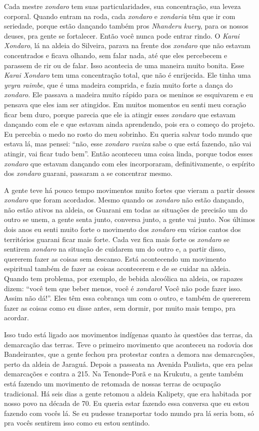 Cada mestre \emph{xondaro} tem suas particularidades, sua concentração, sua
leveza corporal. Quando entram na roda, cada \emph{xondaro} e \emph{xondaria} têm que
ir com seriedade, porque estão dançando também pros \emph{Nhanderu kuery}, para
os nossos deuses, pra gente se fortalecer. Então você nunca pode entrar
rindo. O \emph{Karai Xondaro}, lá na aldeia do Silveira, parava na frente dos
\emph{xondaro} que não estavam concentrados e ficava olhando, sem falar nada,
até que eles percebecem e parassem de rir ou de falar. Isso acontecia
de uma maneira muito bonita. Esse \emph{Karai Xondaro} tem uma concentração
total, que não é enrijecida. Ele tinha uma \emph{yvyra raimbe}, que é uma
madeira comprida, e fazia muito forte a dança do \emph{xondaro}. Ele passava a
madeira muito rápido para os meninos se esquivarem e eu pensava que
eles iam ser atingidos. Em muitos momentos eu senti meu coração ficar
bem duro, porque parecia que ele ia atingir esses \emph{xondaro} que estavam
dançando com ele e que estavam ainda aprendendo, pois era o começo do
projeto. Eu percebia o medo no rosto do meu sobrinho. Eu queria salvar
todo mundo que estava lá, mas pensei: ``não, esse \emph{xondaro ruvixa} sabe o
que está fazendo, não vai atingir, vai ficar tudo bem''. Então aconteceu
uma coisa linda, porque todos esses \emph{xondaro} que estavam dançando com
eles incorporaram, definitivamente, o espírito dos \emph{xondaro} guarani,
passaram a se concentrar mesmo.

A gente teve há pouco tempo movimentos muito fortes que vieram a partir
desses \emph{xondaro} que foram acordados. Mesmo quando os \emph{xondaro} não estão
dançando, não estão ativos na aldeia, os Guarani em todas as situações
de precisão um do outro se unem, a gente senta junto, conversa junto, a
gente vai junto. Nos últimos dois anos eu senti muito forte o movimento
dos \emph{xondaro} em vários cantos dos territórios guarani ficar mais forte.
Cada vez fica mais forte os \emph{xondaro} se sentirem \emph{xondaro} na situação de
cuidarem um do outro e, a partir disso, quererem fazer as coisas sem
descanso. Está acontecendo um movimento espiritual também de fazer as
coisas acontecerem e de se cuidar na aldeia. Quando tem problema, por
exemplo, de bebida alcoólica na aldeia, os rapazes dizem: ``você tem que
beber menos, você é \emph{xondaro}! Você não pode fazer isso. Assim não dá!''.
Eles têm essa cobrança um com o outro, e também de quererem fazer as
coisas como eu disse antes, sem dormir, por muito mais tempo, pra
acordar.

Isso tudo está ligado aos movimentos indígenas quanto às questões das
terras, da demarcação das terras. Teve o primeiro movimento que
aconteceu na rodovia dos Bandeirantes, que a gente fechou pra protestar
contra a demora nas demarcações, perto da aldeia de Jaraguá. Depois a
passeata na Avenida Paulista, que era pelas demarcações e contra a 
215. Na Tenonde-Porã e na Krukutu, a gente também está fazendo um
movimento de retomada de nossas terras de ocupação tradicional. Há seis
dias a gente retomou a aldeia Kalipety, que era habitada por nosso povo
na década de 70. Eu queria estar fazendo essa conversa que eu estou
fazendo com vocês lá. Se eu pudesse transportar todo mundo pra lá seria
bom, só pra vocês sentirem isso como eu estou sentindo.


